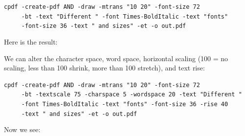 \documentclass{book}
\begin{document}
\begin{framed}
 \noindent\small\verb?cpdf -create-pdf AND -draw -mtrans "10 20" -font-size 72?\\
 \noindent\small\verb?     -bt -text "Different " -font Times-BoldItalic -text "fonts"?\\
 \noindent\small\verb?     -font-size 36 -text " and sizes" -et -o out.pdf?
\end{framed}

\noindent Here is the result:

\bigskip
{}
\bigskip

\noindent We can alter the character space, word space, horizontal scaling (100 = no scaling, less than 100 shrink, more than 100 stretch), and text rise:

\begin{framed}
 \noindent\small\verb?cpdf -create-pdf AND -draw -mtrans "10 20" -font-size 72?\\
 \noindent\small\verb?     -bt -textscale 75 -charspace 5 -wordspace 20 -text "Different "?\\
 \noindent\small\verb?     -font Times-BoldItalic -text "fonts" -font-size 36 -rise 40?\\
 \noindent\small\verb?     -text " and sizes" -et -o out.pdf? 
\end{framed}

\noindent Now we see:

\bigskip
{}
\bigskip
\end{document}
